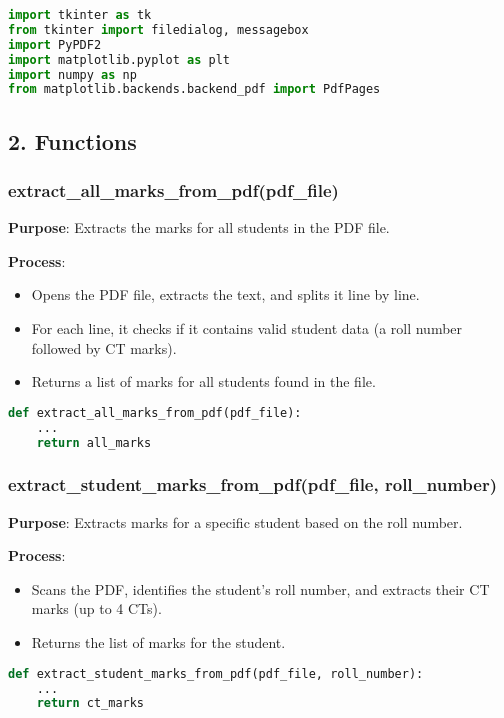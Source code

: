 \documentclass{article}
\begin{document}
\begin{lstlisting}[language=Python, caption=Library Imports]
import tkinter as tk
from tkinter import filedialog, messagebox
import PyPDF2
import matplotlib.pyplot as plt
import numpy as np
from matplotlib.backends.backend_pdf import PdfPages
\end{lstlisting}

\subsection{2. Functions}

\subsubsection{extract\_all\_marks\_from\_pdf(pdf\_file)}
\textbf{Purpose}: Extracts the marks for all students in the PDF file.

\textbf{Process}: 
\begin{itemize}
    \item Opens the PDF file, extracts the text, and splits it line by line.
    \item For each line, it checks if it contains valid student data (a roll number followed by CT marks).
    \item Returns a list of marks for all students found in the file.
\end{itemize}

\begin{lstlisting}[language=Python, caption=Function to Extract Marks of All Students]
def extract_all_marks_from_pdf(pdf_file):
    ...
    return all_marks
\end{lstlisting}

\subsubsection{extract\_student\_marks\_from\_pdf(pdf\_file, roll\_number)}
\textbf{Purpose}: Extracts marks for a specific student based on the roll number.

\textbf{Process}:
\begin{itemize}
    \item Scans the PDF, identifies the student's roll number, and extracts their CT marks (up to 4 CTs).
    \item Returns the list of marks for the student.
\end{itemize}

\begin{lstlisting}[language=Python, caption=Function to Extract Specific Student Marks]
def extract_student_marks_from_pdf(pdf_file, roll_number):
    ...
    return ct_marks
\end{lstlisting}
\end{document}
